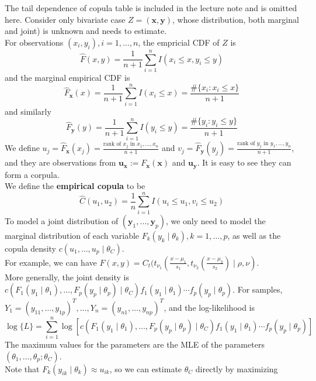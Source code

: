 \documentclass[11pt]{article}
\theoremstyle{definition}
\begin{document}
The tail dependence of copula table is included in the lecture note and is omitted here.
Consider only bivariate case $Z=(\mathbf{x}, \mathbf{y})$, whose distribution, both marginal and joint) is unknown and needs to estimate.\\
For observations $(x_i, y_i), i = 1,\ldots, n$, the empricial CDF of $Z$ is 
\[
\hat{F}(x,y)=\frac{1}{n+1}\sum_{i=1}^n I(x_i\leq x, y_i\leq y)
\]
and the marginal empirical CDF is
\[
\hat{F}_\mathbf{x}(x)=\frac{1}{n+1}\sum_{i=1}^n I(x_i\leq x) = \frac{\#\{x_i: x_i\leq x\}}{n+1}
\]
and similarly
\[
\hat{F}_\mathbf{y}(y)=\frac{1}{n+1}\sum_{i=1}^n I(y_i\leq y) = \frac{\#\{y_i: y_i\leq y\}}{n+1}
\]
We define $u_j=\hat{F}_\mathbf{x}(x_j) = \frac{\text{rank of }x_j\text{ in }x_1,\ldots, x_n}{n+1}$ and
$v_j=\hat{F}_\mathbf{y}(y_j) = \frac{\text{rank of }y_j\text{ in }y_1,\ldots, y_n}{n+1}$, and they are observations from $\mathbf{u}_\mathbf{x}:=F_\mathbf{x}(\mathbf{x})$ and $\mathbf{u}_\mathbf{y}$. It is easy to see they can form a corpula.\\
We define the \textbf{empirical copula} to be
\[
\hat{C}(u_1,u_2)=\frac{1}{n}\sum_{i=1}^n I(u_i\leq u_1, v_i\leq u_2)
\]
To model a joint distribution of $(\mathbf{y}_1, \ldots, \mathbf{y}_p)$, we only need to model the marginal distribution of each variable $F_k(y_k\mid \theta_k), k = 1,\ldots, p$, as well as the copula density $c(u_1,\ldots, u_p\mid \theta_C)$.\\
For example, we can have $F(x,y) = C_t(t_{\nu_1}(\frac{x-\mu_1}{s_1}, t_{\nu_2}(\frac{x-\mu_2}{s_2})\mid \rho, \nu)$.\\
More generally, the joint density is $c(F_1(y_1\mid \theta_1), \ldots, F_p(y_p\mid \theta_p)\mid \theta_C)f_1(y_1\mid \theta_1)\cdots f_p(y_p\mid \theta_p)$. For samples, $Y_1 = (y_{11}, \ldots, y_{1p})^T, \ldots, Y_n=(y_{n1},\ldots, y_{np})^T$, and the log-likelihood is
\[
\log\{L\}=\sum_{i=1}^n \log[c(F_1(y_1\mid \theta_1), \ldots, F_p(y_p\mid \theta_p)\mid \theta_C)f_1(y_1\mid \theta_1)\cdots f_p(y_p\mid \theta_p)]
\]
The maximum values for the parameters are the MLE of the parameters $(\theta_1, \ldots, \theta_p; \theta_C)$.\\
Note that $F_k(y_{ik}\mid \theta_k)\approx u_{ik}$, so we can estimate $\theta_C$ directly by maximizing 
\end{document}

